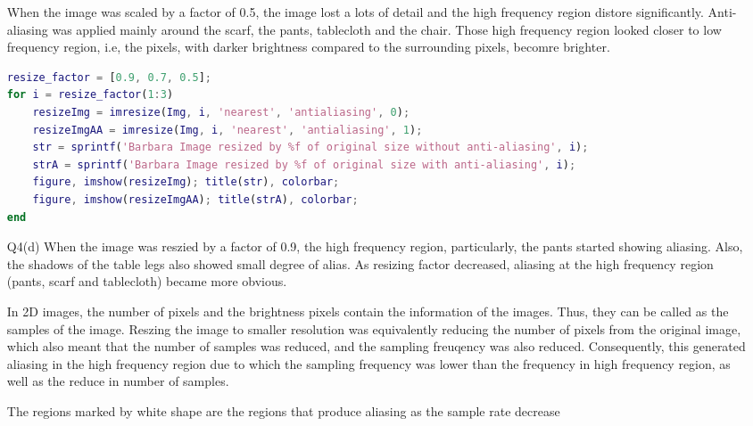 \documentclass{article}
\begin{document}
\begin{enumerate}
When the image was scaled by a factor of 0.5, the image lost a lots of detail and 
the high frequency region distore significantly. Anti-aliasing was applied mainly 
around the scarf, the pants, tablecloth and the chair. Those high frequency region 
looked closer to low frequency region, i.e, the pixels, with darker brightness 
compared to the surrounding pixels, becomre brighter.

\begin{lstlisting}[language=Matlab]
% Running in a debugger, put breakpoint on imshow() function to stop and compare results
resize_factor = [0.9, 0.7, 0.5];
for i = resize_factor(1:3)
    resizeImg = imresize(Img, i, 'nearest', 'antialiasing', 0);
    resizeImgAA = imresize(Img, i, 'nearest', 'antialiasing', 1);
    str = sprintf('Barbara Image resized by %f of original size without anti-aliasing', i);
    strA = sprintf('Barbara Image resized by %f of original size with anti-aliasing', i);
    figure, imshow(resizeImg); title(str), colorbar;
    figure, imshow(resizeImgAA); title(strA), colorbar;
end
\end{lstlisting}

\item[Q4(d)] When the image was reszied by a factor of 0.9, the high frequency 
region, particularly, the pants started showing aliasing. Also, the shadows of 
the table legs also showed small degree of alias. As resizing factor decreased, 
aliasing at the high frequency region (pants, scarf and tablecloth) became 
more obvious. 

In 2D images, the number of pixels and the brightness pixels contain the information 
of the images. Thus, they can be called as the samples of the image. Reszing the 
image to smaller resolution was equivalently reducing the number of pixels from the 
original image, which also meant that the number of samples was reduced, and 
the sampling freuqency was also reduced. Consequently, this generated aliasing 
in the high frequency region due to which the sampling frequency was lower than 
the frequency in high frequency region, as well as the reduce in number of samples.

The regions marked by white shape are the regions that produce aliasing as the 
sample rate decrease


\end{enumerate}
\end{document}
